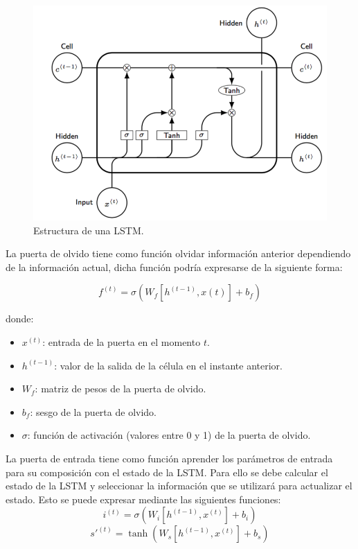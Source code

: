 \begin{figure}[h]
	\centering
	\includegraphics[width=120mm]{imagenes/lstm-struct.png}
	\caption{Estructura de una LSTM.}
	\label{fig:22}
\end{figure}
\verticalspace

La puerta de olvido tiene como función olvidar información anterior dependiendo de la información actual, dicha función podría expresarse de la siguiente forma:

$$ f^{(t)} = \sigma( W_f[h^{(t-1)}, x(t)] + b_f) $$

\noindent donde:
\begin{itemize}
	\item $x^{(t)}$: entrada de la puerta en el momento $t$.
	\item $h^{(t-1)} $: valor de la salida de la célula en el instante anterior.
	\item $W_f $: matriz de pesos de la puerta de olvido.
	\item $b_f $: sesgo de la puerta de olvido.
	\item $\sigma$: función de activación (valores entre 0 y 1) de la puerta de olvido.
\end{itemize}
\verticalspace

La puerta de entrada tiene como función aprender los parámetros de entrada para su composición con el estado de la LSTM. Para ello se debe calcular el estado de la LSTM y seleccionar la información que se utilizará para actualizar el estado. Esto se puede expresar mediante las siguientes funciones:\newline
$$ i^{(t)} = \sigma(W_i[h^{(t-1)}, x^{(t)}] + b_i) $$
$$ s'^{(t)} = \tanh(W_s[h^(t-1), x^{(t)}] + b_s) $$

